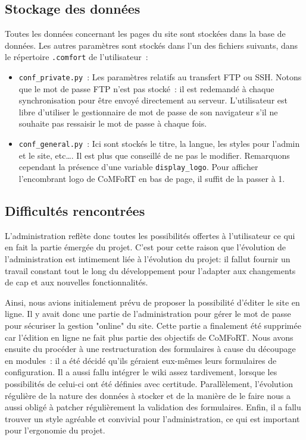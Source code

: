 \documentclass[final,11pt,a4paper,twoside,titlepage]{article}
\newcommand{\p}{\vspace{0.3em}}
\newcommand{\code}[1]{\texttt{#1}}
\begin{document}
{    \subsection{Stockage des données}
    Toutes les données concernant les pages du site sont stockées dans la base
    de données. 
    Les autres paramètres sont stockés dans l'un des fichiers suivants, dans le
    répertoire \code{.comfort} de l'utilisateur~:\p
    \begin{itemize}
    \item \code{conf\_private.py}~: Les paramètres relatifs au transfert FTP ou
    SSH.
    Notons que le mot de passe FTP n'est pas stocké~: il est redemandé à chaque
    synchronisation pour être envoyé directement au serveur. L'utilisateur est
    libre d'utiliser le gestionnaire de mot de passe de son navigateur s'il ne
    souhaite pas ressaisir le mot de passe à chaque fois.\p
    
    \item \code{conf\_general.py}~: Ici sont stockés le titre, la langue, les 
    styles pour l'admin et le site, etc\ldots. Il est plus que conseillé de ne
    pas le modifier. Remarquons cependant la présence d'une variable
    \code{display\_logo}. Pour afficher l'encombrant logo de CoMFoRT en bas de
    page, il suffit de la passer à 1.
    \end{itemize}
    
    \subsection{Difficultés rencontrées}
      L'administration reflète donc toutes les possibilités offertes à 
      l'utilisateur ce qui en fait la partie émergée du projet. C'est pour cette
      raison que l'évolution de l'administration est intimement liée à
      l'évolution du projet: il fallut fournir un travail constant tout le long
      du développement pour l'adapter aux changements de cap et aux nouvelles
      fonctionnalités. \p
      
      Ainsi, nous avions initialement prévu de proposer la possibilité d'éditer
      le site en ligne. Il y avait donc une partie de l'administration pour
      gérer le mot de passe pour sécuriser la gestion "online" du site. Cette
      partie a finalement été supprimée car l'édition en ligne ne fait plus
      partie des objectifs de CoMFoRT. Nous avons ensuite du procéder à une
      restructuration
      des formulaires à cause du découpage en modules~: il a été décidé qu'ils
      géraient eux-mêmes leurs formulaires de configuration. Il a aussi fallu
      intégrer le wiki assez tardivement, lorsque les possibilités de celui-ci
      ont été définies avec certitude. Parallèlement, l'évolution 
      régulière de la nature des données à stocker et de la manière
      de le faire nous a aussi obligé à patcher régulièrement la validation des
      formulaires. Enfin, il a fallu trouver un style agréable et convivial pour
      l'administration, ce qui est important pour l'ergonomie du projet.


}
\end{document}
